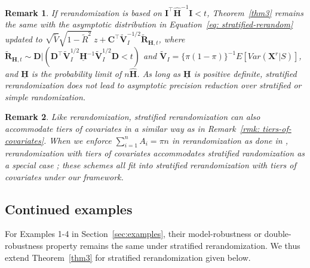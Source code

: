\documentclass[12pt]{article}
\newtheorem{remark}{Remark}
\newcommand{\bX}{\boldsymbol{X}}\newcommand{\bO}{\boldsymbol{O}}
\newcommand{\bI}{\boldsymbol{I}}
\newcommand{\bD}{\boldsymbol{D}}
\newcommand{\bfV}{\mathbf{V}}
\begin{document}
{\begin{remark}\label{remark3}
    If rerandomization is based on $\bI^\top \widehat{\mathbf{H}}^{-1} \bI < t$, Theorem~\ref{thm3} remains the same with the asymptotic distribution in Equation~\eqref{eq: stratified-rerandom} updated to  $\sqrt{\widetilde{V}}\sqrt{1-\widetilde{R}^2}\ z +  \boldsymbol{C}^\top\widetilde{\bfV}_I^{-1/2} \widetilde{\boldsymbol{R}}_{\mathbf{H},t}$, where $\widetilde{\boldsymbol{R}}_{\mathbf{H},t} \sim \bD|(\bD^\top\widetilde{\bfV}_I^{1/2} \underline{\mathbf{H}}^{-1}\widetilde{\bfV}_I^{1/2} \bD < t)$ and $\widetilde{\bfV}_I = \{\pi(1-\pi)\}^{-1} E[Var(\bX^r|S)]$, and $\underline{\mathbf{H}}$ is the probability limit of $n\widehat{\mathbf{H}}$. As long as $\underline{\mathbf{H}}$ is positive definite, stratified rerandomization does not lead to asymptotic precision reduction over stratified or simple randomization.
\end{remark}

\begin{remark}
    Like rerandomization, stratified rerandomization can also accommodate tiers of covariates in a similar way as in Remark~\ref{rmk: tiers-of-covariates}. When we enforce $\sum_{i=1}^n A_i = \pi n$ in rerandomization as done in \cite{li2018asymptotic}, rerandomization with tiers of covariates accommodates stratified randomization as a special case \citep{wang2023rerandomization}; these schemes all fit into stratified rerandomization with tiers of covariates under our framework. 
    
\end{remark}


\subsection{Continued examples}

For Examples 1-4 in Section~\ref{sec:examples}, their model-robustness or double-robustness property remains the same under stratified rerandomization. We thus extend Theorem~\ref{thm3} for stratified rerandomization given below. 

}
\end{document}
